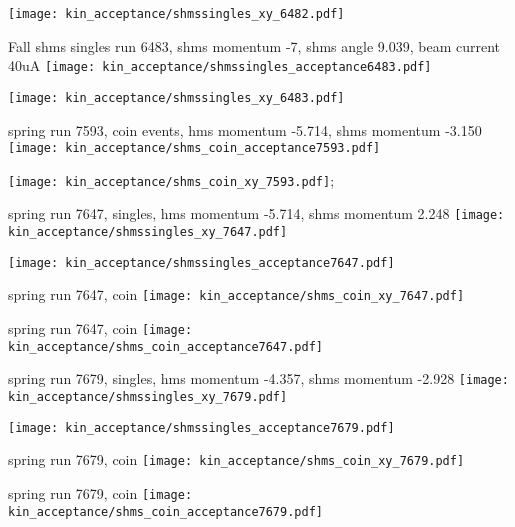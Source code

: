 \documentclass[aspectratio=169,xcolor=dvipsnames]{beamer}
\begin{document}
\begin{frame}{}
  \texttt{[image: kin\_acceptance/shmssingles\_xy\_6482.pdf]}
\end{frame}

\begin{frame}{}
  Fall shms singles run 6483, shms momentum -7, shms angle 9.039, beam current 40uA
  \texttt{[image: kin\_acceptance/shmssingles\_acceptance6483.pdf]}
\end{frame}  

\begin{frame}{}
  \texttt{[image: kin\_acceptance/shmssingles\_xy\_6483.pdf]}
\end{frame}

\begin{frame}{}
  spring run 7593, coin events, hms momentum -5.714, shms momentum -3.150
  \texttt{[image: kin\_acceptance/shms\_coin\_acceptance7593.pdf]}
\end{frame}

\begin{frame}{}
  \texttt{[image: kin\_acceptance/shms\_coin\_xy\_7593.pdf]};
\end{frame}

\begin{frame}{}
  spring run 7647, singles, hms momentum -5.714, shms momentum 2.248
  \texttt{[image: kin\_acceptance/shmssingles\_xy\_7647.pdf]}
\end{frame}

\begin{frame}
  \texttt{[image: kin\_acceptance/shmssingles\_acceptance7647.pdf]}
\end{frame}

\begin{frame}
  spring run 7647, coin
  \texttt{[image: kin\_acceptance/shms\_coin\_xy\_7647.pdf]}
\end{frame}

\begin{frame}
  spring run 7647, coin
  \texttt{[image: kin\_acceptance/shms\_coin\_acceptance7647.pdf]}
\end{frame}

\begin{frame}{}
  spring run 7679, singles, hms momentum -4.357, shms momentum -2.928
  \texttt{[image: kin\_acceptance/shmssingles\_xy\_7679.pdf]}
\end{frame}

\begin{frame}
  \texttt{[image: kin\_acceptance/shmssingles\_acceptance7679.pdf]}
\end{frame}

\begin{frame}
  spring run 7679, coin
  \texttt{[image: kin\_acceptance/shms\_coin\_xy\_7679.pdf]}
\end{frame}

\begin{frame}
  spring run 7679, coin
  \texttt{[image: kin\_acceptance/shms\_coin\_acceptance7679.pdf]}
\end{frame}
\end{document}
